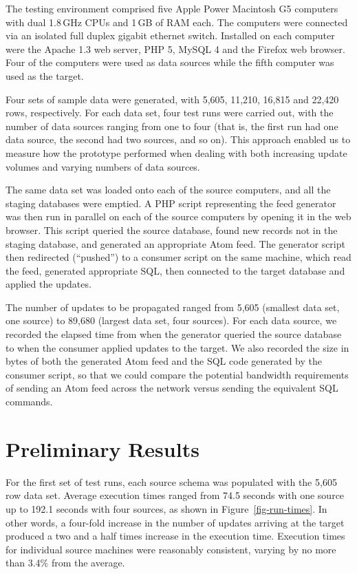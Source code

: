 \documentclass{CRPITStyle}
\begin{document}
The testing environment comprised five Apple Power Macintosh G5
computers with dual 1.8\,GHz CPUs and 1\,GB of RAM each. The computers
were connected via an isolated full duplex gigabit ethernet switch.
Installed on each computer were the Apache 1.3 web server, PHP 5, MySQL
4 and the Firefox web browser. Four of the computers were used as data
sources while the fifth computer was used as the target.

Four sets of sample data were generated, with 5,605, 11,210, 16,815 and
22,420 rows, respectively. For each data set, four test runs were
carried out, with the number of data sources ranging from one to four
(that is, the first run had one data source, the second had two sources,
and so on). This approach enabled us to measure how the prototype
performed when dealing with both increasing update volumes and varying
numbers of data sources.

The same data set was loaded onto each of the source computers, and all
the staging databases were emptied. A PHP script representing the feed
generator was then run in parallel on each of the source computers by
opening it in the web browser. This script queried the source database,
found new records not in the staging database, and generated an
appropriate Atom feed. The generator script then redirected (``pushed'')
to a consumer script on the same machine, which read the feed, generated
appropriate SQL, then connected to the target database and applied the
updates.

The number of updates to be propagated ranged from 5,605 (smallest data
set, one source) to 89,680 (largest data set, four sources). For each
data source, we recorded the elapsed time from when the generator
queried the source database to when the consumer applied updates to the
target. We also recorded the size in bytes of both the generated Atom
feed and the SQL code generated by the consumer script, so that we could
compare the potential bandwidth requirements of sending an Atom feed
across the network versus sending the equivalent SQL commands.


\section{Preliminary Results}
\label{sec-results}

For the first set of test runs, each source schema was populated with
the 5,605 row data set. Average execution times ranged from 74.5 seconds
with one source up to 192.1 seconds with four sources, as shown in
Figure~\ref{fig-run-times}. In other words, a four-fold increase in the
number of updates arriving at the target produced a two and a half times
increase in the execution time. Execution times for individual source
machines were reasonably consistent, varying by no more than 3.4\% from
the average.
\end{document}
